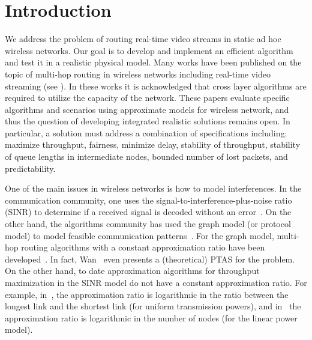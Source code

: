 \documentclass[12pt]{article}
\newenvironment{proof sketch}[1]{\noindent {\emph{Proof sketch of #1:}}}{\hfill \qed}
\begin{document}
\section{Introduction}

We address the problem of routing real-time video streams in static ad
hoc wireless networks.  Our goal is to develop and implement an
efficient algorithm and test it in a realistic physical model.  Many
works have been published on the topic of multi-hop routing in
wireless networks including real-time video streaming (see
\cite{setton2005cross,khan2006application,shan2005cross,van2005cross}).
In these works it is acknowledged that cross layer algorithms are
required to utilize the capacity of the network.  These papers
evaluate specific algorithms and scenarios using approximate models
for wireless network, and thus the question of developing integrated
realistic solutions remains open. In particular, a solution must
address a combination of specifications including: maximize
throughput, fairness, minimize delay, stability of throughput,
stability of queue lengths in intermediate nodes, bounded number of
lost packets, and predictability.

One of the main issues in wireless networks is how to model
interferences. In the communication community, one uses the
signal-to-interference-plus-noise ratio (SINR) to determine if a
received signal is decoded without an
error~\cite{gallager1968information}. On the other hand, the
algorithms community has used the graph model (or protocol model) to
model feasible communication
patterns~\cite{jain2005impact,alicherry2005joint11}. For the graph
model, multi-hop routing algorithms with a constant approximation
ratio have been
developed~\cite{kumar2005algorithmic,alicherry2005joint11,buragohain2007improved,wan2009multiflows}.
In fact, Wan~\cite{wan2009multiflows} even presents a (theoretical)
PTAS for the problem. On the other hand, to date approximation
algorithms for throughput maximization in the SINR model do not have a
constant approximation ratio. For example, in~\cite{ChafekarCapacity},
the approximation ratio is logarithmic in the ratio between the
longest link and the shortest link (for uniform transmission powers),
and in~\cite{EMM11} the approximation ratio is logarithmic in the
number of nodes (for the linear power model).
\end{document}
